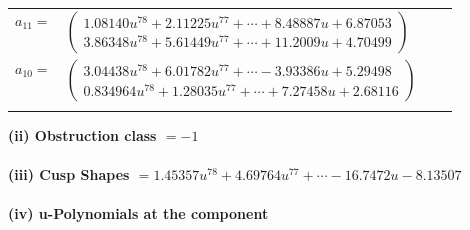 \documentclass[1p]{elsarticle_modified}
\theoremstyle{definition}
\begin{document}
\begin{tabular}{m{7pt} m{180pt} m{7pt} m{180pt} }
\flushright $a_{11}=$&$\begin{pmatrix}1.08140 u^{78}+2.11225 u^{77}+\cdots+8.48887 u+6.87053\\3.86348 u^{78}+5.61449 u^{77}+\cdots+11.2009 u+4.70499\end{pmatrix}$ \\
\flushright $a_{10}=$&$\begin{pmatrix}3.04438 u^{78}+6.01782 u^{77}+\cdots-3.93386 u+5.29498\\0.834964 u^{78}+1.28035 u^{77}+\cdots+7.27458 u+2.68116\end{pmatrix}$\\&\end{tabular}
\flushleft \textbf{(ii) Obstruction class $= -1$}\\~\\
\flushleft \textbf{(iii) Cusp Shapes $= 1.45357 u^{78}+4.69764 u^{77}+\cdots-16.7472 u-8.13507$}\\~\\
\newpage\renewcommand{\arraystretch}{1}
\flushleft \textbf{(iv) u-Polynomials at the component}\newline \\
\end{document}
